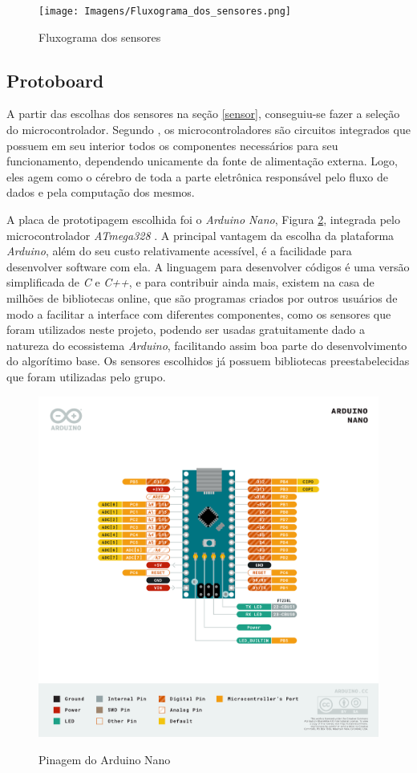 \documentclass[acronym,symbols,table]{fei}
\begin{document}
\begin{figure}[!htb]
\centering
    \caption{Fluxograma dos sensores}
    \texttt{[image: Imagens/Fluxograma\_dos\_sensores.png]}
    \label{fig:fluxosenso}
\end{figure}
\newpage
\subsection{Protoboard} \label {Proto}

A partir das escolhas dos sensores na seção \ref{sensor}, conseguiu-se fazer a seleção do microcontrolador. Segundo \textcite{kerschbaumer2013microcontroladores}, os microcontroladores são circuitos integrados que possuem em seu interior todos os componentes necessários para seu funcionamento, dependendo unicamente da fonte de alimentação externa. Logo, eles agem como o cérebro de toda a parte eletrônica responsável pelo fluxo de dados e pela computação dos mesmos.

A placa de prototipagem escolhida foi o \textit{Arduino Nano}, Figura \ref{fig:pinagem arduino}, integrada pelo microcontrolador \textit{ATmega328} \cite{UNO}. A principal vantagem da escolha da plataforma \textit{Arduino}, além do seu custo relativamente acessível, é a facilidade para desenvolver software com ela. A linguagem para desenvolver códigos é uma versão simplificada de \textit{C} e \textit{C++}, e para contribuir ainda mais, existem na casa de milhões de bibliotecas online, que são programas criados por outros usuários de modo a facilitar a interface com diferentes componentes, como os sensores que foram utilizados neste projeto, podendo ser usadas gratuitamente dado a natureza do ecossistema \textit{Arduino}, facilitando assim boa parte do desenvolvimento do algorítimo base. Os sensores escolhidos já possuem bibliotecas preestabelecidas que foram utilizadas pelo grupo.

\begin{figure}[!htb]
\centering
    \caption{Pinagem do Arduino Nano}
    \includegraphics[width=0.85\linewidth]{Imagens/Pinagem_Arduino_Nano.png}
    \label{fig:pinagem arduino}
\end{figure}
\end{document}
